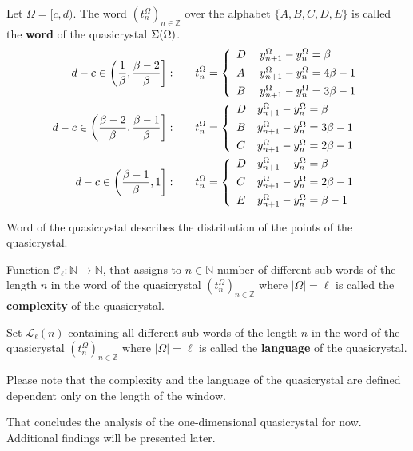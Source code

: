 \documentclass[text.tex]{subfiles}
\begin{document}
\begin{definition}
Let $\Omega = [c,d)$. The word $\left(t_n^\Omega\right)_{n\in\mathbb{Z}}$ over the alphabet $\{A,B,C,D,E\}$ is called the \textbf{word} of the quasicrystal $\Sigma(\Omega)$.
\begin{align*}
d-c \in \left( \frac{1}{\beta}, \frac{\beta - 2}{\beta} \right]:& \qquad
		t_n^\Omega = \left\{ \begin{array}{l l}
			D & y_{n+1}^\Omega - y_n^\Omega = \beta	\\[1.5mm]
			A~& y_{n+1}^\Omega - y_n^\Omega = 4\beta-1\\[1.5mm]
			B & y_{n+1}^\Omega - y_n^\Omega = 3\beta-1
		\end{array} \right.
\\
d-c \in \left( \frac{\beta-2}{\beta}, \frac{\beta-1}{\beta} \right]:& \qquad
		t_n^\Omega = \left\{ \begin{array}{l l}
			D & y_{n+1}^\Omega - y_n^\Omega = \beta	\\[1.5mm]
			B & y_{n+1}^\Omega - y_n^\Omega = 3\beta-1\\[1.5mm]
			C & y_{n+1}^\Omega - y_n^\Omega = 2\beta-1
		\end{array} \right.
\\
d-c \in \left( \frac{\beta-1}{\beta}, 1 \right]:& \qquad
		t_n^\Omega = \left\{ \begin{array}{l l}
			D & y_{n+1}^\Omega - y_n^\Omega = \beta	\\[1.5mm]
			C & y_{n+1}^\Omega - y_n^\Omega = 2\beta-1\\[1.5mm]
			E & y_{n+1}^\Omega - y_n^\Omega = \beta-1
		\end{array} \right.
\end{align*}
\end{definition}

\begin{remark}
Word of the quasicrystal describes the distribution of the points of the quasicrystal.
\end{remark}

\begin{definition}
Function $\mathcal{C}_\ell: \mathbb{N} \to \mathbb{N}$, that assigns to $n\in\mathbb{N}$ number of different sub-words of the length $n$ in the word of the quasicrystal $\left(t_n^\Omega\right)_{n\in\mathbb{Z}}$ where $|\Omega| = \ell$ is called the \textbf{complexity} of the quasicrystal.
\end{definition}

\begin{definition}
Set $\mathcal{L}_\ell(n)$ containing all different sub-words of the length $n$ in the word of the quasicrystal $\left(t_n^\Omega\right)_{n\in\mathbb{Z}}$ where $|\Omega| = \ell$ is called the \textbf{language} of the quasicrystal.
\end{definition}

\begin{remark}
Please note that the complexity and the language of the quasicrystal are defined dependent only on the length of the window. 
\end{remark}

That concludes the analysis of the one-dimensional quasicrystal for now. Additional findings will be presented later. 
\end{document}
